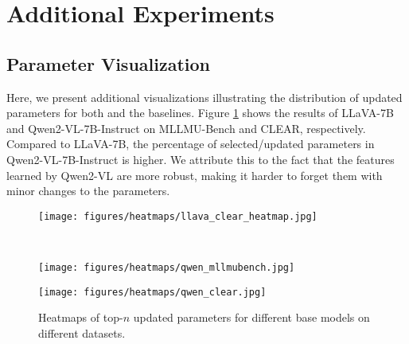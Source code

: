 \section{Additional Experiments}\label{app:additional}
\subsection{Parameter Visualization}\label{app:viz}
Here, we present additional visualizations illustrating the distribution of updated parameters for both \method and the baselines. Figure \ref{fig:viz_plus} shows the results of LLaVA-7B and Qwen2-VL-7B-Instruct on MLLMU-Bench and CLEAR, respectively. Compared to LLaVA-7B, the percentage of selected/updated parameters in Qwen2-VL-7B-Instruct is higher. We attribute this to the fact that the features learned by Qwen2-VL are more robust, making it harder to forget them with minor changes to the parameters.

\begin{figure}[!t]
\centering
        \begin{minipage}[c]{0.48\textwidth}
		\texttt{[image:  figures/heatmaps/llava\_clear\_heatmap.jpg]}
		\label{fig:first}
	\end{minipage}\\
 
	\begin{minipage}[c]{0.48\textwidth}
		\texttt{[image: figures/heatmaps/qwen\_mllmubench.jpg]}
            \label{fig:second}
	\end{minipage}

        \begin{minipage}[c]{0.48\textwidth}
		\texttt{[image: figures/heatmaps/qwen\_clear.jpg]}
            \label{fig:third}
	\end{minipage}
\caption{Heatmaps of top-$n$ updated parameters for different base models on different datasets.}
\label{fig:viz_plus}
\end{figure}






